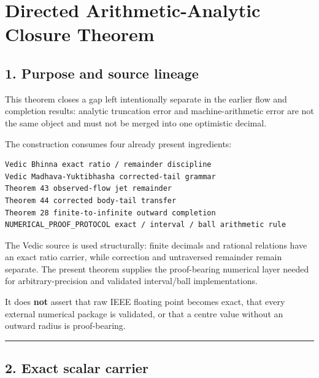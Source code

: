 \hypertarget{directed-arithmetic-analytic-closure-theorem}{%
\chapter{Directed Arithmetic-Analytic Closure Theorem}\label{directed-arithmetic-analytic-closure-theorem}}

\hypertarget{purpose-and-source-lineage}{%
\section{1. Purpose and source lineage}\label{purpose-and-source-lineage}}

This theorem closes a gap left intentionally separate in the earlier flow and
completion results: analytic truncation error and machine-arithmetic error are
not the same object and must not be merged into one optimistic decimal.

The construction consumes four already present ingredients:

\begin{verbatim}
Vedic Bhinna exact ratio / remainder discipline
Vedic Madhava-Yuktibhasha corrected-tail grammar
Theorem 43 observed-flow jet remainder
Theorem 44 corrected body-tail transfer
Theorem 28 finite-to-infinite outward completion
NUMERICAL_PROOF_PROTOCOL exact / interval / ball arithmetic rule
\end{verbatim}

The Vedic source is used structurally: finite decimals and rational relations
have an exact ratio carrier, while correction and untraversed remainder remain
separate. The present theorem supplies the proof-bearing numerical layer needed
for arbitrary-precision and validated interval/ball implementations.

It does \textbf{not} assert that raw IEEE floating point becomes exact, that every
external numerical package is validated, or that a centre value without an
outward radius is proof-bearing.

\begin{center}\rule{0.5\linewidth}{0.5pt}\end{center}

\hypertarget{exact-scalar-carrier}{%
\section{2. Exact scalar carrier}\label{exact-scalar-carrier}}

